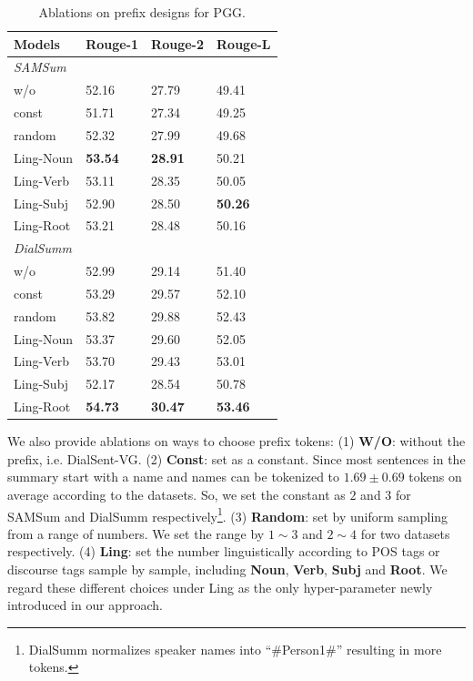 \begin{table}
	\small
	\centering
	\begin{tabular}{llll}
		\toprule[1pt]
		\textbf{Models} & \textbf{Rouge-1} & \textbf{Rouge-2} & \textbf{Rouge-L} \\
		\midrule[1pt] 
		\multicolumn{4}{l}{\textit{SAMSum}} \\
		{w/o} & 52.16 & 27.79& 49.41\\
		{const} & 51.71& 27.34&49.25 \\
		{random} & 52.32& 27.99&49.68 \\
		{Ling-Noun} &\textbf{53.54} & \textbf{28.91}&50.21\\
		{Ling-Verb} &53.11 &28.35 &50.05 \\
		{Ling-Subj} &52.90 &28.50 & \textbf{50.26}\\
		{Ling-Root} &53.21 & 28.48&50.16 \\
		\midrule[1pt]
		\multicolumn{4}{l}{\textit{DialSumm}} \\
		{w/o} & 52.99& 29.14&51.40 \\
		{const} &53.29 &29.57 &52.10 \\
		{random} &53.82 & 29.88&52.43\\
		{Ling-Noun} &53.37 & 29.60& 52.05\\
		{Ling-Verb} &53.70 & 29.43&53.01 \\
		{Ling-Subj} &52.17 & 28.54&50.78 \\
		{Ling-Root} &\textbf{54.73} & \textbf{30.47}&\textbf{53.46}\\
		\bottomrule[1pt]
	\end{tabular}
	\caption{Ablations on prefix designs for PGG.}
	\label{tab:prefixablation}
\end{table}

We also provide ablations on ways to choose prefix tokens:
(1) \textbf{W/O}: without the prefix, i.e. DialSent-VG.
(2) \textbf{Const}: set as a constant. Since most sentences in the summary start with a name and names can be tokenized to $1.69\pm0.69$ tokens on average according to the datasets. So, we set the constant as $2$ and $3$ for SAMSum and DialSumm respectively\footnote{DialSumm normalizes speaker names into ``\#Person1\#'' resulting in more tokens.}.
(3) \textbf{Random}: set by uniform sampling from a range of numbers. We set the range by $1\sim3$ and $2\sim4$ for two datasets respectively.
(4) \textbf{Ling}: set the number linguistically according to POS tags or discourse tags sample by sample, including \textbf{Noun}, \textbf{Verb}, \textbf{Subj} and \textbf{Root}. We regard these different choices under Ling as the only hyper-parameter newly introduced in our approach.

